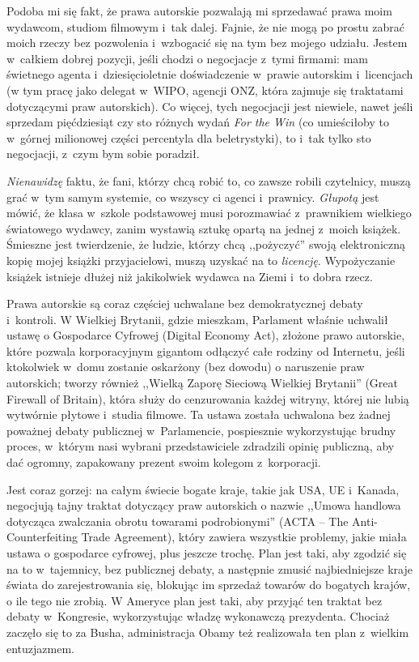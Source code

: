 \documentclass[oneside,polish,11pt,rmheadings]{mwbk}
\begin{document}
Podoba mi się fakt, że prawa autorskie pozwalają mi sprzedawać prawa moim wydawcom, studiom filmowym i~tak dalej. Fajnie, że nie mogą po prostu zabrać moich rzeczy bez pozwolenia i~wzbogacić się na tym bez mojego udziału. Jestem w~całkiem dobrej pozycji, jeśli chodzi o negocjacje z~tymi firmami: mam świetnego agenta i~dziesięcioletnie doświadczenie w~prawie autorskim i~licencjach (w tym pracę jako delegat w~WIPO, agencji ONZ, która zajmuje się traktatami dotyczącymi praw autorskich). Co więcej, tych negocjacji jest niewiele, nawet jeśli sprzedam pięćdziesiąt czy sto różnych wydań \textit{For the Win }(co umieściłoby to w~górnej milionowej części percentyla dla beletrystyki), to i~tak tylko sto negocjacji, z~czym bym sobie poradził. 


\textit{Nienawidzę }faktu, że fani, którzy chcą robić to, co zawsze robili czytelnicy, muszą grać w~tym samym systemie, co wszyscy ci agenci i~prawnicy. \textit{Głupotą }jest mówić, że klasa w~szkole podstawowej musi porozmawiać z~prawnikiem wielkiego światowego wydawcy, zanim wystawią sztukę opartą na jednej z~moich książek. Śmieszne jest twierdzenie, że ludzie, którzy chcą ,,pożyczyć'' swoją elektroniczną kopię mojej książki przyjacielowi, muszą uzyskać na to \textit{licencję}. Wypożyczanie książek istnieje dłużej niż jakikolwiek wydawca na Ziemi i~to dobra rzecz. 


Prawa autorskie są coraz częściej uchwalane bez demokratycznej debaty i~kontroli. W Wielkiej Brytanii, gdzie mieszkam, Parlament właśnie uchwalił ustawę o Gospodarce Cyfrowej (Digital Economy Act), złożone prawo autorskie, które pozwala korporacyjnym gigantom odłączyć całe rodziny od Internetu, jeśli ktokolwiek w~domu zostanie oskarżony (bez dowodu) o naruszenie praw autorskich; tworzy również ,,Wielką Zaporę Sieciową Wielkiej Brytanii'' (Great Firewall of Britain), która służy do cenzurowania każdej witryny, której nie lubią wytwórnie płytowe i~studia filmowe. Ta ustawa została uchwalona bez żadnej poważnej debaty publicznej w~Parlamencie, pospiesznie wykorzystując brudny proces, w~którym nasi wybrani przedstawiciele zdradzili opinię publiczną, aby dać ogromny, zapakowany prezent swoim kolegom z~korporacji. 


Jest coraz gorzej: na całym świecie bogate kraje, takie jak USA, UE i~Kanada, negocjują tajny traktat dotyczący praw autorskich o nazwie ,,Umowa handlowa dotycząca zwalczania obrotu towarami podrobionymi'' (ACTA -- The Anti-Counterfeiting Trade Agreement), który zawiera wszystkie problemy, jakie miała ustawa o gospodarce cyfrowej, plus jeszcze trochę. Plan jest taki, aby zgodzić się na to w~tajemnicy, bez publicznej debaty, a następnie zmusić najbiedniejsze kraje świata do zarejestrowania się, blokując im sprzedaż towarów do bogatych krajów, o ile tego nie zrobią. W Ameryce plan jest taki, aby przyjąć ten traktat bez debaty w~Kongresie, wykorzystując władzę wykonawczą prezydenta. Chociaż zaczęło się to za Busha, administracja Obamy też realizowała ten plan z~wielkim entuzjazmem. 
\end{document}
